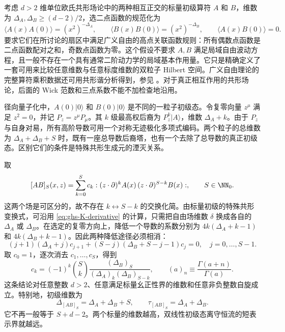 考虑 $d>2$ 维单位欧氏共形场论中的两种相互正交的标量初级算符 $A$ 和 $B$，维数为 $\Delta_A,\Delta_B\ge(d-2)/2$，选二点函数的规范化为
\begin{equation}\label{eq:ghs-r4-generalized-free-two-points}
 \langle A(x)A(0)\rangle=(x^2)^{-\Delta_A},\qquad
 \langle B(x)B(0)\rangle=(x^2)^{-\Delta_B},\qquad
 \langle A(x)B(0)\rangle=0.
\end{equation}
要求它们在所讨论的扇区中满足广义自由的高点关联函数规则：所有偶数点函数是二点函数配对之和，奇数点函数为零。这个假设不要求 $A,B$ 满足局域自由波动方程，且一般不存在一个具有通常二阶动力学的局域基本作用量。它只是精确定义了一套可用来比较任意维数与任意标度维数的双粒子 Hilbert 空间。广义自由理论的完整算符乘积数据还可用共形谐分析得到，参见 \cite{ghs-karateev-harmonic}。对于真正相互作用的共形场论，后面的 Wick 范数和三点系数不能不加检查地沿用。

径向量子化中，$A(0)|0\rangle$ 和 $B(0)|0\rangle$ 是不同的一粒子初级态。令复零向量 $z^\mu$ 满足 $z^2=0$，并记 $P_z=z^\mu P_\mu$。其 $k$ 级最高权后裔为 $P_z^k|A\rangle$，维数 $\Delta_A+k$。由于 $P_z$ 与自身对易，所有高阶导数可用一个对称无迹极化多项式编码。两个粒子的总维数为 $\Delta_A+\Delta_B+S$ 时，既有一座总导数后裔塔，也有一个去除了总导数的真正初级态。区别它们的条件是特殊共形生成元的湮灭关系。


取
\begin{equation}\label{eq:ghs-r4-mixed-bilinear-def}
 [AB]_S(x,z)=\sum_{k=0}^S c_k:
 (z\cdot\partial)^k A(x)\,(z\cdot\partial)^{S-k}B(x):,
 \qquad S\in\NN_0.
\end{equation}
这两个场是可区分的，故不存在 $k\leftrightarrow S-k$ 的交换化简。由标量初级的特殊共形变换式，可沿用 \cref{eq:ghs-K-derivative} 的计算，只需把自由场维数 $\delta$ 换成各自的 $\Delta_A$ 或 $\Delta_B$。在选定的复零方向上，降低一个导数的系数分别为 $4k(\Delta_A+k-1)$ 和 $4k(\Delta_B+k-1)$。因此两种降低途径必须相消：
\begin{equation}\label{eq:ghs-r4-mixed-recurrence}
 (j+1)(\Delta_A+j)c_{j+1}
 +(S-j)(\Delta_B+S-j-1)c_j=0,
 \quad j=0,\ldots,S-1.
\end{equation}
取 $c_0=1$，逐次消去 $c_1,\ldots,c_S$，得到
\begin{equation}\label{eq:ghs-r4-mixed-primary-coefficients}
 c_k=(-1)^k\binom Sk\frac{(\Delta_B)_S}
 {(\Delta_A)_k(\Delta_B)_{S-k}},
 \qquad(a)_n\equiv\frac{\Gamma(a+n)}{\Gamma(a)}.
\end{equation}
这条结论对任意整数 $d>2$、任意满足标量幺正性界的维数和任意非负整数自旋成立。特别地，初级维数为
\begin{equation}\label{eq:ghs-r4-mixed-dimension}
 \Delta_{[AB]_S}=\Delta_A+\Delta_B+S,
 \qquad\tau_{[AB]_S}=\Delta_A+\Delta_B.
\end{equation}
它不再一般等于 $S+d-2$。两个标量的维数越高，双线性初级态离守恒流的短表示界就越远。


